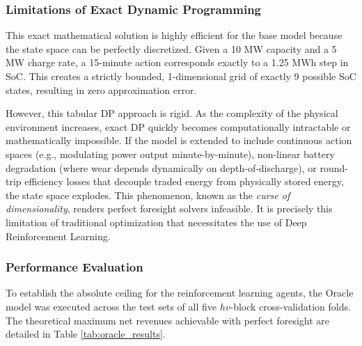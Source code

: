             \subsubsection{Limitations of Exact Dynamic Programming}
            
            This exact mathematical solution is highly efficient for the base model because the state space can be perfectly discretized. Given a 10 MW capacity and a 5 MW charge rate, a 15-minute action corresponds exactly to a 1.25 MWh step in SoC. This creates a strictly bounded, 1-dimensional grid of exactly 9 possible SoC states, resulting in zero approximation error.
            
            However, this tabular DP approach is rigid. As the complexity of the physical environment increases, exact DP quickly becomes computationally intractable or mathematically impossible. If the model is extended to include continuous action spaces (e.g., modulating power output minute-by-minute), non-linear battery degradation (where wear depends dynamically on depth-of-discharge), or round-trip efficiency losses that decouple traded energy from physically stored energy, the state space explodes. This phenomenon, known as the \textit{curse of dimensionality}, renders perfect foresight solvers infeasible. It is precisely this limitation of traditional optimization that necessitates the use of Deep Reinforcement Learning.

            \subsubsection{Performance Evaluation}
                To establish the absolute ceiling for the reinforcement learning agents, the Oracle model was executed across the test sets of all five $hv$-block cross-validation folds. The theoretical maximum net revenues achievable with perfect foresight are detailed in Table \ref{tab:oracle_results}.
                
